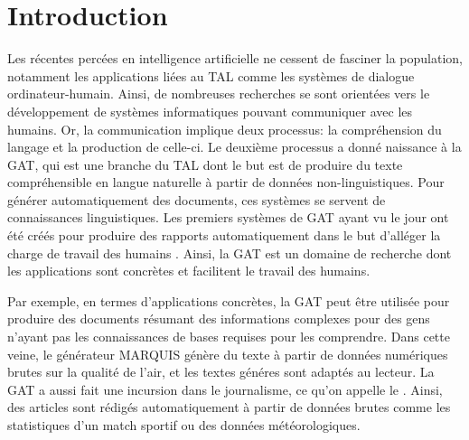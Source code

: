 
\chapter*{Introduction}



Les récentes percées en intelligence artificielle ne cessent de fasciner la population, notamment les applications liées au \acf{TAL} comme les systèmes de dialogue ordinateur-humain. Ainsi, de nombreuses recherches se sont orientées vers le développement de systèmes informatiques pouvant communiquer avec les humains. Or, la communication implique deux processus: la compréhension du langage et la production de celle-ci. Le deuxième processus a donné naissance à la \acf{GAT}, qui est une branche du \ac{TAL} dont le but est de produire du texte compréhensible en langue naturelle à partir de données non-linguistiques. Pour générer automatiquement des documents, ces systèmes se servent de connaissances linguistiques. Les premiers systèmes de \ac{GAT} ayant vu le jour ont été créés pour produire des rapports automatiquement dans le but d'alléger la charge de travail des humains \citep{ReiterBuildingNaturalLanguage2000}. Ainsi, la \ac{GAT} est un domaine de recherche dont les applications sont concrètes et facilitent le travail des humains.

Par exemple, en termes d'applications concrètes, la \ac{GAT} peut être utilisée pour produire des documents résumant des informations complexes pour des gens n'ayant pas les connaissances de bases requises pour les comprendre. Dans cette veine, le générateur MARQUIS \citep{WannerMARQUISGENERATIONUSERTAILORED2010} génère du texte à partir de données numériques brutes sur la qualité de l'air, et les textes généres sont adaptés au lecteur. La \ac{GAT} a aussi fait une incursion dans le journalisme, ce qu'on appelle le  \citep{W17-3513}. Ainsi, des articles sont rédigés automatiquement à partir de données brutes comme les statistiques d'un match sportif ou des données météorologiques.

